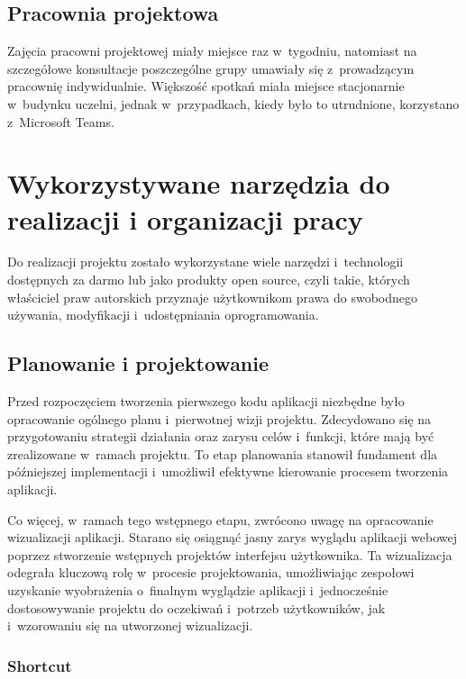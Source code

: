 \subsection{Pracownia projektowa}
Zajęcia pracowni projektowej miały miejsce raz w~tygodniu, natomiast na szczegółowe konsultacje
poszczególne grupy umawiały się z~prowadzącym pracownię indywidualnie. Większość spotkań miała
miejsce stacjonarnie w~budynku uczelni, jednak w~przypadkach, kiedy było to utrudnione, korzystano
z~Microsoft Teams.



\section{Wykorzystywane narzędzia do realizacji i organizacji pracy}

Do realizacji projektu zostało wykorzystane wiele narzędzi i~technologii
dostępnych za darmo lub jako produkty open source, czyli takie,
których właściciel praw autorskich przyznaje użytkownikom prawa
do swobodnego używania, modyfikacji i~udostępniania oprogramowania.


\subsection{Planowanie i projektowanie}

Przed rozpoczęciem tworzenia pierwszego kodu aplikacji niezbędne było
opracowanie ogólnego planu i~pierwotnej wizji projektu. Zdecydowano
się na przygotowaniu strategii działania oraz
zarysu celów i~funkcji, które mają być zrealizowane w~ramach projektu.
To etap planowania stanowił fundament dla późniejszej implementacji
i~umożliwił efektywne kierowanie procesem tworzenia aplikacji.

Co więcej, w~ramach tego wstępnego etapu, zwrócono uwagę na
opracowanie wizualizacji aplikacji. Starano się osiągnąć jasny
zarys wyglądu aplikacji webowej poprzez stworzenie wstępnych projektów
interfejsu użytkownika. Ta wizualizacja odegrała kluczową rolę
w~procesie projektowania, umożliwiając zespołowi uzyskanie wyobrażenia
o~finalnym wyglądzie aplikacji i~jednocześnie dostosowywanie projektu
do oczekiwań i~potrzeb użytkowników, jak i~wzorowaniu się na utworzonej
wizualizacji.


\subsubsection{Shortcut}

